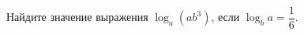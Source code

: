\begin{ex}
	\begin{condition}
		Найдите значение выражения \( \log_a (ab^3) \), если \( \log_b a = \dfrac{1}{6} \).
	\end{condition}
\end{ex}